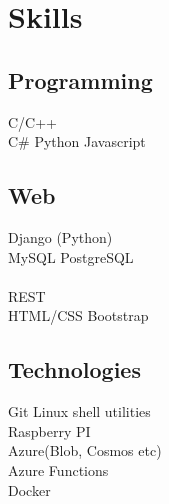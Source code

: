 \documentclass[]{deedy-resume-openfont}
\begin{document}
\begin{minipage}[t]{0.30\textwidth}
\sectionsep


\section{Skills}
\subsection{Programming}
\textbullet{}   C/C++  \\
\textbullet{} C\# 
\textbullet{} Python 
\textbullet{} Javascript 

\sectionsep

\subsection{Web}
\textbullet{} Django (Python) \\ \textbullet{} MySQL 
\textbullet{} PostgreSQL \\  \\ \textbullet{} REST \\ 
\textbullet{} HTML/CSS \textbullet{} Bootstrap \\ 
\sectionsep

\subsection{Technologies}
\textbullet{} Git \textbullet{} Linux shell utilities \\
\textbullet{} Raspberry PI \\
\textbullet{} Azure(Blob, Cosmos etc) \\
\textbullet{} Azure Functions \\
\textbullet{} Docker  \\
\textbullet{}  \\


\end{minipage}
\end{document}

